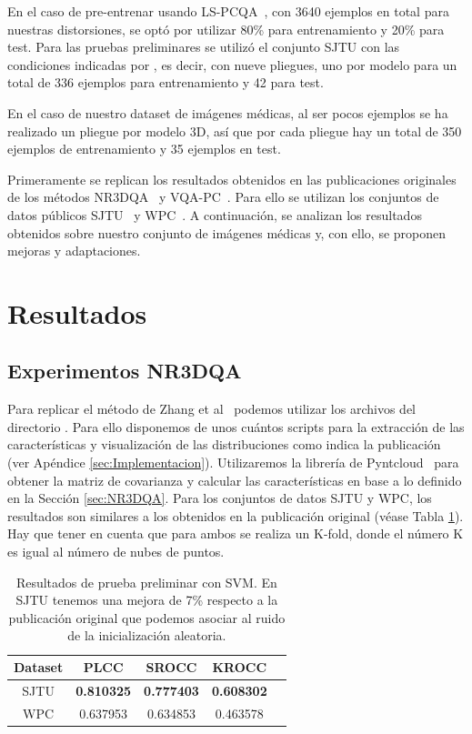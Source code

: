 En el caso de pre-entrenar usando LS-PCQA~\cite{ResSCNN}, con 3640 ejemplos en total para 
nuestras distorsiones, se optó por utilizar 80\% para entrenamiento y 20\% para test. 
Para las pruebas preliminares se utilizó el conjunto SJTU con las condiciones indicadas por 
\cite{VQA-PC}, es decir, con nueve pliegues, uno por modelo para un total de 336 ejemplos para entrenamiento y 42 para test. 

En el caso de nuestro dataset de imágenes médicas, al ser pocos ejemplos 
se ha realizado un pliegue por modelo 3D, así que por cada pliegue hay un total de 
350 ejemplos de entrenamiento y 35 ejemplos en test. 

Primeramente se replican los resultados obtenidos en las publicaciones originales 
de los métodos NR3DQA~\cite{NR3DQA} y VQA-PC~\cite{VQA-PC}. Para ello se utilizan
los conjuntos de datos públicos SJTU~\cite{SJTU} y WPC~\cite{WPC1,WPC2}. 
A continuación, se analizan los resultados obtenidos sobre nuestro conjunto 
de imágenes médicas y, con ello, se proponen mejoras y adaptaciones.

\section{Resultados}
\subsection{Experimentos NR3DQA}
Para replicar el método de Zhang et al~\cite{NR3DQA} podemos utilizar los 
archivos del directorio . Para ello disponemos de unos cuántos scripts para la extracción de las características y visualización de las distribuciones 
como indica la publicación (ver Apéndice \ref{sec:Implementacion}). 
Utilizaremos la librería de Pyntcloud~\cite{Pyntcloud} para obtener 
la matriz de covarianza y calcular las características en base a lo definido 
en la Sección \ref{sec:NR3DQA}.
Para los conjuntos de datos SJTU y WPC, los resultados 
son similares a los obtenidos en la publicación original (véase Tabla \ref{tab:PlainNR3DQA}).
Hay que tener en cuenta que para ambos se realiza un K-fold, donde el número 
K es igual al número de nubes de puntos.

\begin{table}[htp]
  \scriptsize
  \begin{center}
    \begin{tabular}[c]{|c|c|c|c|c|}
      \hline
      \rowcolor[HTML]{FFC702}
      \textbf{Dataset} & \textbf{PLCC} & \textbf{SROCC} & \textbf{KROCC} \\ 
      \hline
      SJTU & \textbf{0.810325} & \textbf{0.777403} & \textbf{0.608302} \\ 
      \hline 
      WPC & 0.637953 & 0.634853 & 0.463578 \\
      \hline
    \end{tabular}
  \end{center}
  \caption[Resultados de prueba preliminar con SVM.]{Resultados de prueba preliminar con SVM.
  En SJTU tenemos una mejora de 7\% respecto a la publicación original que podemos asociar al ruido de la inicialización aleatoria. }
  \label{tab:PlainNR3DQA}
\end{table}

